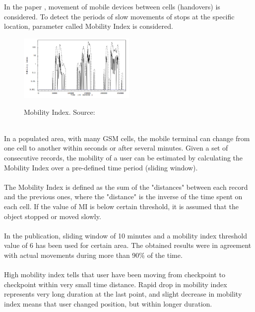 In the paper \cite{MobilityIndexGIS}, movement of mobile devices between cells (handovers) is considered. To detect the periods of slow movements of stops at the specific location, parameter called Mobility Index is considered. 
\begin{figure}[!ht]
	\centering
	\includegraphics[width=0.5\textwidth]{images/intro_mobility_index.png}\\
	\caption{Mobility Index. Source: \cite{MobilityIndexGIS}}
	\label{fig:introduction_mob_index}
\end{figure}
\\
In a populated area, with many GSM cells, the mobile
terminal can change from one cell to another within
seconds or after several minutes. Given a set of consecutive records, the mobility of a user can be estimated by calculating the Mobility Index over a pre-defined time period (sliding window). 
\\\\
The Mobility Index is defined as the sum of the "distances" between each record and the previous ones, where the "distance" is the inverse of the time spent on each cell. If the value of MI is below certain threshold, it is assumed that the object stopped or moved slowly. 
\\\\
In the publication, sliding window of 10 minutes and a mobility index threshold value of 6 has been used for certain area. The obtained results were in agreement with actual movements during more than 90\% of the time. 
\\\\
High mobility index tells that user have been moving from checkpoint to checkpoint within very small time distance. Rapid drop in mobility index represents very long duration at the last point, and slight decrease in mobility index means that user changed position, but within longer duration.